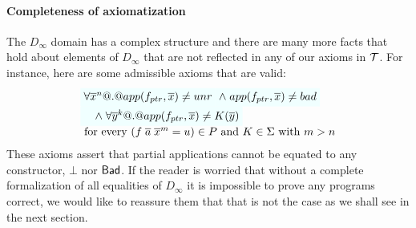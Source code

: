 \paragraph{Completeness of axiomatization}

The $D_\infty$ domain has a complex structure and there are many more facts that
hold about elements of $D_\infty$ that are not reflected in any of our axioms in ${\cal T}$.
For instance, here are some admissible axioms that are valid:
\[\begin{array}{l}
    \formula{\forall \oln{x}{n} @.@ app(f_{ptr},\xs) \neq \unr}
    \formula{\land\; app(f_{ptr},\xs) \neq \bad} \\
    \formula{\quad\land\; \forall \oln{y}{k} @.@ app(f_{ptr},\xs) \neq K(\ol{y})} \\
    \text{ for every } (f\;\ol{a}\;\oln{x}{m} = u) \in P
    \text{ and } K \in \Sigma \text{ with } m > n
\end{array}\]
These axioms assert that partial applications cannot be equated to
any constructor, $\bot$ nor $\mathsf{Bad}$. If the reader is worried that without a
complete formalization of all equalities of $D_\infty$ it is impossible to prove any
programs correct, we would like to reassure them that that is not the case as we
shall see in the next section.










